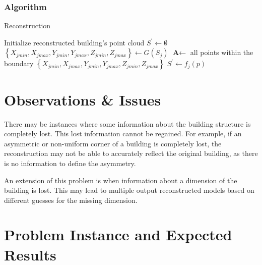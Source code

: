 \documentclass[12pt,a4paper]{article}
\begin{document}
    \subsubsection{Algorithm}
    \begin{algorithm}[H]
        \caption{Reconstruction}
        \begin{algorithmic}
            \State Initialize reconstructed building's point cloud $S^\prime \leftarrow \emptyset$
            \State $\left\{X_{jmin},X_{jmax},Y_{jmin},Y_{jmax},Z_{jmin},Z_{jmax}\right\} \leftarrow G(S_j)$ 
            \State $\textbf{A} \leftarrow$ all points within the boundary $\left\{X_{jmin},X_{jmax},Y_{jmin},Y_{jmax},Z_{jmin},Z_{jmax}\right\}$
            \State $S^\prime \leftarrow f_j(p)$
            \EndFor
            \EndFor
        \end{algorithmic}
    \end{algorithm}
    
    
    \section{Observations \& Issues}\label{issues}
    
    There may be instances where some information about the building structure is completely lost. This lost information cannot be regained. For example, if an asymmetric or non-uniform corner of a building is completely lost, the reconstruction may not be able to accurately reflect the original building, as there is no information to define the asymmetry.
    
    An extension of this problem is when information about a dimension of the building is lost. This may lead to multiple output reconstructed models based on different guesses for the missing dimension.
    
    \section{Problem Instance and Expected Results}
    
\end{document}
